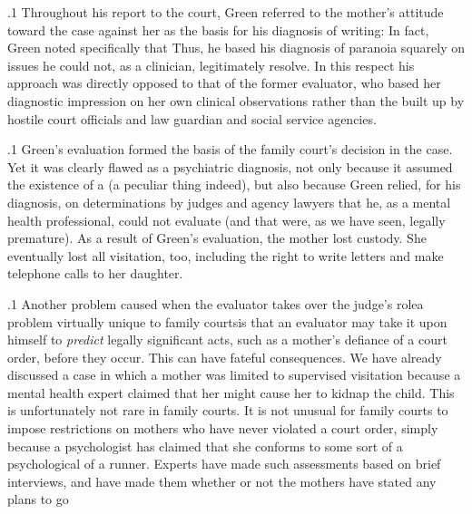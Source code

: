 \documentclass[11pt, twoside]{article}
\begin{document}
{\p.1{%
Throughout his report to the court, Green referred to the mother’s
attitude toward the case against her as the basis for his diagnosis of
 writing:  In fact, Green noted specifically that  Thus, he based his diagnosis of paranoia squarely on issues he could
not, as a clinician, legitimately resolve. In this respect his approach was
directly opposed to that of the former evaluator, who based her diagnostic impression on her own clinical observations rather than the  built up by hostile court officials and law guardian and social
service agencies.
}%

\p.1{%
Green’s evaluation formed the basis of the family court’s decision in
the case. Yet it was clearly flawed as a psychiatric diagnosis, not only
because it assumed the existence of a  (a peculiar thing indeed), but also because Green relied, for his diagnosis, on
determinations by judges and agency lawyers that he, as a mental health
professional, could not evaluate (and that were, as we have seen, legally
premature). As a result of Green’s evaluation, the mother lost custody.
She eventually lost all visitation, too, including the right to write letters
and make telephone calls to her daughter.
}%

\p.1{%
Another problem caused when the evaluator takes over the judge’s
role\mdash{}a problem virtually unique to family courts\mdash{}is that an evaluator may take it upon himself to \textit{predict} legally significant acts, such
as a mother’s defiance of a court order, before they occur. This can
have fateful consequences. We have already discussed a case in which a
mother was limited to supervised visitation because a mental health expert claimed that her  might cause her to kidnap the child. This is
unfortunately not rare in family courts. It is not unusual for family courts
to impose restrictions on mothers who have never violated a court order,
simply because a psychologist has claimed that she conforms to some
sort of a psychological  of a runner. Experts have made such
assessments based on brief interviews, and have made them whether or
not the mothers have stated any plans to go 
}%


}
\end{document}
